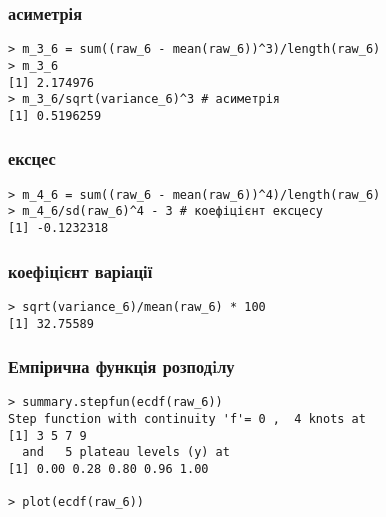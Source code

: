\documentclass[a4paper, 12pt, oneside]{extarticle}
\begin{document}

\subsubsection{асиметрія}

\begin{verbatim}
> m_3_6 = sum((raw_6 - mean(raw_6))^3)/length(raw_6)
> m_3_6
[1] 2.174976
> m_3_6/sqrt(variance_6)^3 # асиметрія
[1] 0.5196259
\end{verbatim}

\subsubsection{ексцес}
\begin{verbatim}
> m_4_6 = sum((raw_6 - mean(raw_6))^4)/length(raw_6)
> m_4_6/sd(raw_6)^4 - 3 # коефіцієнт ексцесу
[1] -0.1232318
\end{verbatim}

\subsubsection{коефiцiєнт варіації}
\begin{verbatim}
> sqrt(variance_6)/mean(raw_6) * 100
[1] 32.75589
\end{verbatim}

\subsubsection{Емпірична функція розподiлу}

\begin{verbatim}
> summary.stepfun(ecdf(raw_6))
Step function with continuity 'f'= 0 ,  4 knots at
[1] 3 5 7 9
  and   5 plateau levels (y) at
[1] 0.00 0.28 0.80 0.96 1.00

> plot(ecdf(raw_6))
\end{verbatim}
\end{document}
